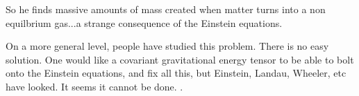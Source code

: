 \documentclass[../rzero]{subfiles}
\begin{document}
So he finds massive amounts of mass created when matter turns into a non equilbrium gas...a strange consequence of the Einstein equations. 

On a more general level, people have studied this problem. There is no easy solution. One would like a covariant gravitational energy tensor to be able to bolt onto the Einstein equations, and fix all this, but Einstein, Landau, Wheeler, etc have looked. It seems it cannot be done.  \cite{08092323EnergyMomentumGravitational}. 
\end{document}
